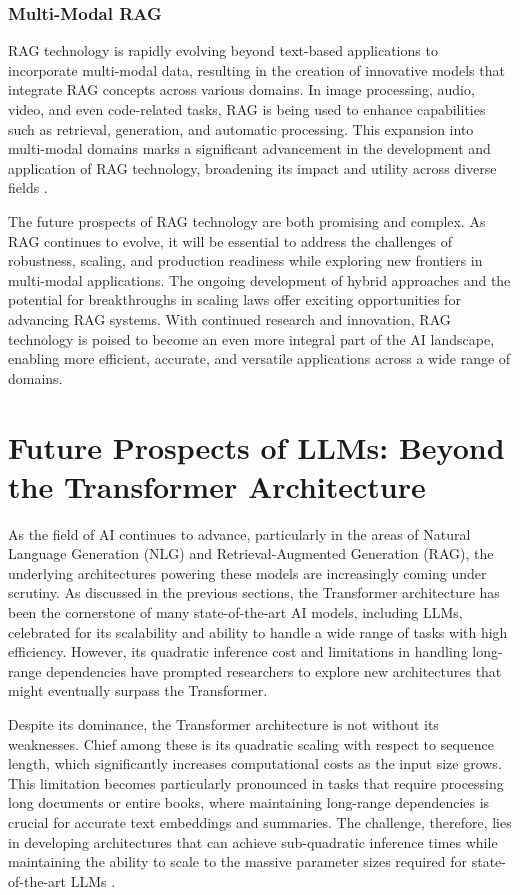 \subsubsection{Multi-Modal RAG}

RAG technology is rapidly evolving beyond text-based applications to incorporate multi-modal data, resulting in the creation of innovative models that integrate RAG concepts across various domains. In image processing, audio, video, and even code-related tasks, RAG is being used to enhance capabilities such as retrieval, generation, and automatic processing. This expansion into multi-modal domains marks a significant advancement in the development and application of RAG technology, broadening its impact and utility across diverse fields \cite{gao2023retrieval}.

The future prospects of RAG technology are both promising and complex. As RAG continues to evolve, it will be essential to address the challenges of robustness, scaling, and production readiness while exploring new frontiers in multi-modal applications. The ongoing development of hybrid approaches and the potential for breakthroughs in scaling laws offer exciting opportunities for advancing RAG systems. With continued research and innovation, RAG technology is poised to become an even more integral part of the AI landscape, enabling more efficient, accurate, and versatile applications across a wide range of domains.

\section{Future Prospects of LLMs: Beyond the Transformer Architecture}

As the field of AI continues to advance, particularly in the areas of Natural Language Generation (NLG) and Retrieval-Augmented Generation (RAG), the underlying architectures powering these models are increasingly coming under scrutiny. As discussed in the previous sections, the Transformer architecture has been the cornerstone of many state-of-the-art AI models, including LLMs, celebrated for its scalability and ability to handle a wide range of tasks with high efficiency. However, its quadratic inference cost and limitations in handling long-range dependencies have prompted researchers to explore new architectures that might eventually surpass the Transformer.

Despite its dominance, the Transformer architecture is not without its weaknesses. Chief among these is its quadratic scaling with respect to sequence length, which significantly increases computational costs as the input size grows. This limitation becomes particularly pronounced in tasks that require processing long documents or entire books, where maintaining long-range dependencies is crucial for accurate text embeddings and summaries. The challenge, therefore, lies in developing architectures that can achieve sub-quadratic inference times while maintaining the ability to scale to the massive parameter sizes required for state-of-the-art LLMs \cite{paull2023transformer}.

